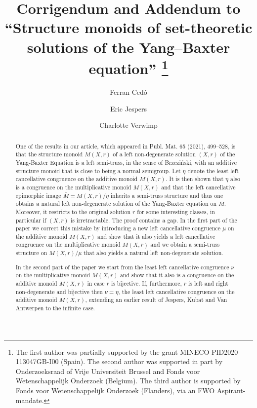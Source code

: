 \documentclass[10pt]{article}
\begin{document}
\title{Corrigendum and Addendum to ``Structure monoids of set-theoretic solutions of the Yang--Baxter equation''
\thanks{The first author was partially supported by the grant MINECO PID2020-113047GB-I00 (Spain).
The
second author was supported in part by Onderzoeksraad of Vrije
Universiteit Brussel and Fonds voor Wetenschappelijk Onderzoek
(Belgium). The third author is supported by Fonds voor Wetenschappelijk Onderzoek (Flanders), via an FWO Aspirant-mandate.}
}\author{Ferran Ced\'o \and Eric Jespers \and Charlotte Verwimp}
\date{}

\maketitle

\begin{abstract}
One of the results in our article, which appeared in Publ. Mat. 65 (2021), 499--528, is that the structure monoid $M(X,r)$ of a left non-degenerate solution $(X,r)$ of the Yang-Baxter Equation  is a left semi-truss, in the sense of Brzezi\'nski, with an additive structure monoid that is close to being a normal semigroup. Let $\eta$ denote the least left cancellative congruence on the additive monoid $M(X,r)$.
It is then  shown  that 
$\eta$ also is a congruence on the multiplicative monoid $M(X,r)$ and that 
the left cancellative epimorphic image $\bar{M}=M(X,r)/\eta$ 
inherits a semi-truss structure and thus one obtains a natural  left non-degenerate solution of the Yang-Baxter equation on $\bar{M}$. 
Moreover, it restricts to the original solution $r$ for some interesting classes, in particular if $(X, r)$ is irretractable. 
The proof contains a gap. In the first part of the paper we correct this mistake by introducing a new left cancellative congruence $\mu$ on the additive monoid $M(X,r)$ and show that it also yields a  left cancellative congruence on the multiplicative monoid $M(X,r)$ and we obtain a semi-truss structure on $M(X,r)/\mu$ that also yields a natural left non-degenerate solution.

In the second part of the paper we start from the least left cancellative congruence $\nu$ on the multiplicative monoid $M(X,r)$ and show that it also is a congruence on the additive monoid $M(X,r)$ in case $r$ is bijective. If, furthermore, $r$ is left and right non-degenerate and bijective then $\nu =\eta$, the least left cancellative congruence on the additive monoid $M(X,r)$, extending an earlier result of Jespers, Kubat and Van Antwerpen to the infinite case.
\end{abstract}
\end{document}
